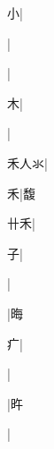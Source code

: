 \begin{multicols}{2}
{{\cjk{}{\cnsym{}　}{\cnsym{}　}小}|{}\par
{\cjk{}{\cnsym{}　}{\cnsym{}　}{\cnsym{}　}}|{}\par
{\cjk{}{\cnsym{}　}{\cnsym{}　}{\cnsym{}　}}|{}\par
{\cjk{}{\cnsym{}　}{\cnsym{}　}木}|{}\par
{\cjk{}{\cnsym{}　}{\cnsym{}　}{\cnsym{}　}}|{}\par
{\cjk{}禾人氺}|{}\par
{\cjk{}{\cnsym{}　}{\cnsym{}　}禾}|{\cjk{}馥}\par
{\cjk{}{\cnsym{}　}卄禾}|{}\par
{\cjk{}{\cnsym{}　}{\cnsym{}　}子}|{}\par
{\cjk{}{\cnsym{}　}{\cnsym{}　}{\cnsym{}　}}|{}\par
{\cjk{}{\cnsym{}　}{\cnsym{}　}{\cnsym{}　}}|{\cjk{}晦}\par
{\cjk{}{\cnsym{}　}{\cnsym{}　}疒}|{}\par
{\cjk{}{\cnsym{}　}{\cnsym{}　}{\cnsym{}　}}|{}\par
{\cjk{}{\cnsym{}　}{\cnsym{}　}{\cnsym{}　}}|{\cjk{}旿}\par
{\cjk{}{\cnsym{}　}{\cnsym{}　}{\cnsym{}　}}|{}\par
}
\end{multicols}
